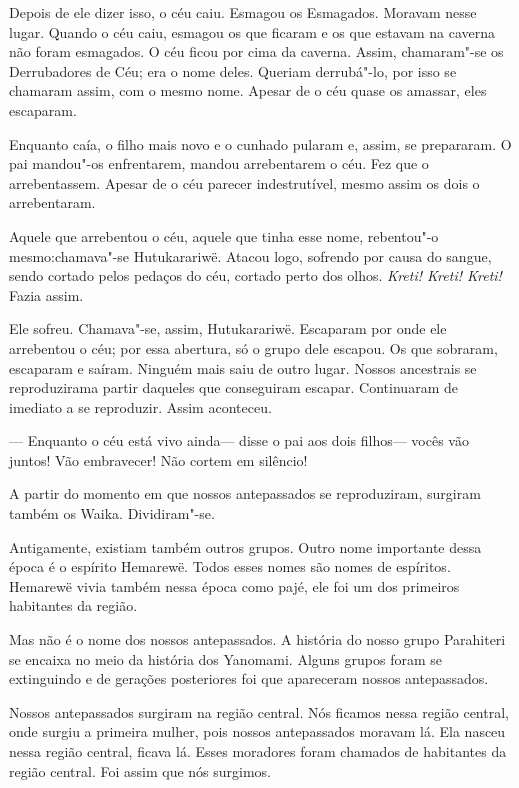 Depois de ele dizer isso, o céu caiu. Esmagou os Esmagados. Moravam
nesse lugar. Quando o céu caiu, esmagou os que ficaram e os que estavam
na caverna não foram esmagados. O céu ficou por cima da caverna. Assim,
chamaram"-se os Derrubadores de Céu; era o nome deles. Queriam
derrubá"-lo, por isso se chamaram assim, com o mesmo nome. Apesar de o
céu quase os amassar, eles escaparam. 

Enquanto caía, o filho mais novo e o cunhado pularam e, assim, se
prepararam. O pai mandou"-os enfrentarem, mandou arrebentarem o céu. Fez
que o arrebentassem. Apesar de o céu parecer indestrutível, mesmo assim
os dois o arrebentaram. 

Aquele que arrebentou o céu, aquele que tinha esse nome, rebentou"-o
mesmo:chamava"-se Hutukarariwë. Atacou logo, sofrendo por causa do
sangue, sendo cortado pelos pedaços do céu, cortado perto dos
olhos. \emph{Kreti! Kreti! Kreti!} Fazia assim. 

Ele sofreu. Chamava"-se, assim, Hutukarariwë. Escaparam por onde ele
arrebentou o céu; por essa abertura, só o grupo dele escapou. Os que
sobraram, escaparam e saíram. Ninguém mais saiu de outro lugar. Nossos
ancestrais se reproduzirama partir daqueles que conseguiram escapar.
Continuaram de imediato a se reproduzir. Assim aconteceu. 

--- Enquanto o céu está vivo ainda--- disse o pai aos dois filhos---
vocês vão juntos! Vão embravecer! Não cortem em silêncio! 

A partir do momento em que nossos antepassados se reproduziram, surgiram
também os Waika. Dividiram"-se.

Antigamente, existiam também outros grupos. Outro nome importante dessa
época é o espírito Hemarewë. Todos esses nomes são nomes de espíritos.
Hemarewë vivia também nessa época como pajé, ele foi um dos primeiros
habitantes da região.

Mas não é o nome dos nossos antepassados. A história do nosso grupo
Parahiteri se encaixa no meio da história dos Yanomami. Alguns grupos
foram se extinguindo e de gerações posteriores foi que apareceram nossos
antepassados. 

 Nossos antepassados surgiram na região central. Nós ficamos nessa
região central, onde surgiu a primeira mulher, pois nossos antepassados
moravam lá. Ela nasceu nessa região central, ficava lá. Esses moradores
foram chamados de habitantes da região central. Foi assim que nós
surgimos.

 

 
